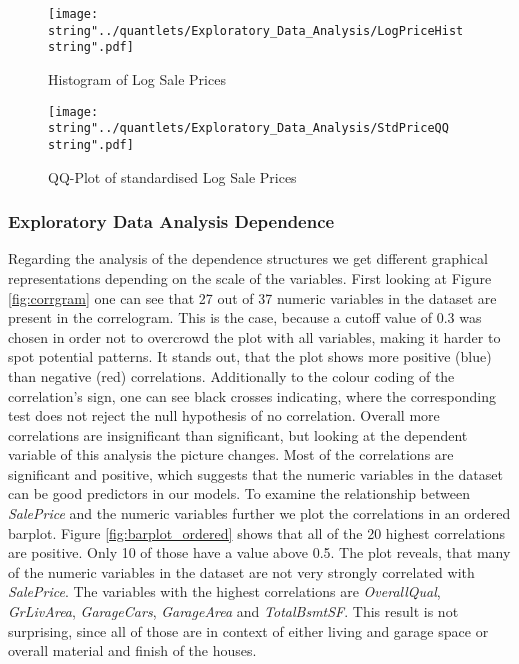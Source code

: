 \begin{figure}[H]
  \centering
\texttt{[image: \\string"../quantlets/Exploratory\_Data\_Analysis/LogPriceHist\\string".pdf]}
  \caption{Histogram of Log Sale Prices}\label{fig:logpricehist}
\end{figure}

\begin{figure}[H]
  \centering
\texttt{[image: \\string"../quantlets/Exploratory\_Data\_Analysis/StdPriceQQ\\string".pdf]}
  \caption{QQ-Plot of standardised Log Sale Prices}\label{fig:stdpriceqq}
\end{figure}




\subsubsection{Exploratory Data Analysis Dependence}
Regarding the analysis of the dependence structures we get different graphical representations depending on the scale of the variables. First looking at Figure \ref{fig:corrgram} one can see that 27 out of 37 numeric variables in the dataset are present in the correlogram. This is the case, because a cutoff value of 0.3 was chosen in order not to overcrowd the plot with all variables, making it harder to spot potential patterns. It stands out, that the plot shows more positive (blue) than negative (red) correlations. Additionally to the colour coding of the correlation's sign, one can see black crosses indicating, where the corresponding test does not reject the null hypothesis of no correlation. Overall more correlations are insignificant than significant, but looking at the dependent variable of this analysis the picture changes. Most of the correlations are significant and positive, which suggests that the numeric variables in the dataset can be good predictors in our models. To examine the relationship between \textit{SalePrice} and the numeric variables further we plot the correlations in an ordered barplot. Figure \ref{fig:barplot_ordered} shows that all of the 20 highest correlations are positive. Only 10 of those have a value above 0.5. The plot reveals, that many of the numeric variables in the dataset are not very strongly correlated with \textit{SalePrice}. The variables with the highest correlations are \textit{OverallQual}, \textit{GrLivArea}, \textit{GarageCars}, \textit{GarageArea} and \textit{TotalBsmtSF}. This result is not surprising, since all of those are in context of either living and garage space or overall material and finish of the houses.

